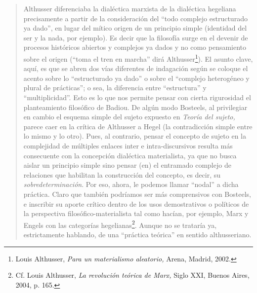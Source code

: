 \begin{quote}
Althusser diferenciaba la dialéctica marxista de la dialéctica hegeliana precisamente a partir de la consideración del \enquote{todo complejo estructurado ya dado}, en lugar del mítico origen de un principio simple (identidad del ser y la nada, por ejemplo). Es decir que la filosofía surge en el devenir de procesos históricos abiertos y complejos ya dados  y no como pensamiento sobre el origen (\enquote{toma el tren en marcha} dirá Althusser\footnote{Louis Althusser, \emph{Para un materialismo aleatorio,} Arena, Madrid, 2002.}). El asunto clave, aquí, es que se abren dos vías diferentes de indagación según se coloque el acento sobre lo \enquote{estructurado ya dado} o sobre el \enquote{complejo heterogéneo y plural de prácticas}; o sea, la diferencia entre \enquote{estructura} y \enquote{multiplicidad}. Esto es lo que nos permite pensar con cierta rigurosidad el planteamiento filosófico de Badiou. De algún modo Bosteels, al privilegiar en cambio el esquema simple del sujeto expuesto en \emph{Teoría del sujeto,} parece caer en la crítica de Althusser a Hegel (la contradicción simple entre lo mismo y lo otro). Pues, al contrario, pensar el concepto de sujeto en la complejidad de múltiples enlaces inter e intra-discursivos  resulta más consecuente con la concepción dialéctica materialista, ya que no busca aislar un principio simple sino pensar (en) el entramado complejo de relaciones que habilitan la construcción del concepto, es decir, su \emph{sobredeterminación}. Por eso, ahora, le podemos llamar \enquote{nodal} a dicha práctica. Claro que también podríamos ser más comprensivos con Bosteels, e inscribir su aporte crítico dentro de los usos demostrativos o políticos de la perspectiva filosófico-materialista tal como hacían, por ejemplo, Marx y Engels con las categorías hegelianas\footnote{Cf. Louis Althusser, \emph{La revolución teórica de Marx,} Siglo XXI, Buenos Aires, 2004, p. 165.}. Aunque no se trataría ya, estrictamente hablando, de una \enquote{práctica teórica} en sentido althusseriano.


\end{quote}
